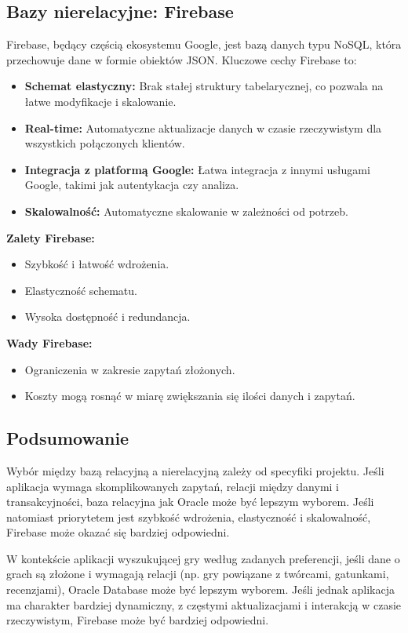 \subsection{Bazy nierelacyjne: Firebase}

Firebase, będący częścią ekosystemu Google, jest bazą danych typu NoSQL, która przechowuje dane w formie obiektów JSON. Kluczowe cechy Firebase to:

\begin{itemize}
\item \textbf{Schemat elastyczny:} Brak stałej struktury tabelarycznej, co pozwala na łatwe modyfikacje i skalowanie.
\item \textbf{Real-time:} Automatyczne aktualizacje danych w czasie rzeczywistym dla wszystkich połączonych klientów.
\item \textbf{Integracja z platformą Google:} Łatwa integracja z innymi usługami Google, takimi jak autentykacja czy analiza.
\item \textbf{Skalowalność:} Automatyczne skalowanie w zależności od potrzeb.
\end{itemize}

\textbf{Zalety Firebase:}
\begin{itemize}
\item Szybkość i łatwość wdrożenia.
\item Elastyczność schematu.
\item Wysoka dostępność i redundancja.
\end{itemize}

\textbf{Wady Firebase:}
\begin{itemize}
\item Ograniczenia w zakresie zapytań złożonych.
\item Koszty mogą rosnąć w miarę zwiększania się ilości danych i zapytań.
\end{itemize}

\subsection{Podsumowanie}

Wybór między bazą relacyjną a nierelacyjną zależy od specyfiki projektu. Jeśli aplikacja wymaga skomplikowanych zapytań, relacji między danymi i transakcyjności, baza relacyjna jak Oracle może być lepszym wyborem. Jeśli natomiast priorytetem jest szybkość wdrożenia, elastyczność i skalowalność, Firebase może okazać się bardziej odpowiedni.

W kontekście aplikacji wyszukującej gry według zadanych preferencji, jeśli dane o grach są złożone i wymagają relacji (np. gry powiązane z twórcami, gatunkami, recenzjami), Oracle Database może być lepszym wyborem. Jeśli jednak aplikacja ma charakter bardziej dynamiczny, z częstymi aktualizacjami i interakcją w czasie rzeczywistym, Firebase może być bardziej odpowiedni.